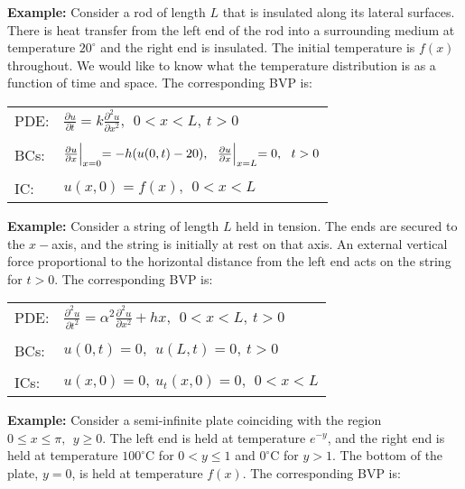 \vspace{0.15cm}

\noindent\textbf{Example: } Consider a rod of length $L$ that is insulated along its lateral surfaces.  There is heat transfer from the left end of the rod into a surrounding medium at temperature $20^{\circ}$ and the right end is insulated.  The initial temperature is $f(x)$ throughout.  We would like to know what the temperature distribution is as a function of time and space.  The corresponding BVP is:
\begin{table}
\begin{tabular}{l l}
PDE: & $\frac{\partial u}{\partial t}=k\frac{\partial^2 u}{\partial x^2}, \ \ 0<x<L, \ t>0 $ \\
& \\
BCs: & $\frac{\partial u}{\partial x}\Bigl|_{x=0} = -h(u(0,t)-20), \ \  \frac{\partial u}{\partial x}\Bigl|_{x=L} = 0, \ \ t>0$ \\
& \\
IC: & $u(x,0) = f(x), \ \ 0<x<L$ \\
\end{tabular}
\end{table}

\vspace{0.25cm}

\noindent\textbf{Example: } Consider a string of length $L$ held in tension.  The ends are secured to the $x-$axis, and the string is initially at rest on that axis.  An external vertical force proportional to the horizontal distance from the left end acts on the string for $t>0$.  The corresponding BVP is:
\begin{table}
\begin{tabular}{l l}
PDE: & $\frac{\partial^2 u}{\partial t^2} = \alpha^2 \frac{\partial^2 u}{\partial x^2} + hx, \ \ 0<x<L, \ t>0 $ \\
& \\
BCs: & $u(0,t)=0, \ \ u(L,t) = 0, \ t>0 $ \\
& \\
ICs: & $u(x,0) = 0, \ u_t(x,0) = 0, \ \ 0<x<L$ \\
\end{tabular}
\end{table}

\vspace{0.25cm}

\noindent\textbf{Example: } Consider a semi-infinite plate coinciding with the region $0 \le x \le \pi, \ \  y\ge 0.$  The left end is held at temperature $e^{-y}$, and the right end is held at temperature $100^{\circ}$C for $0 < y \le 1$ and $0^{\circ}$C for $y>1$.  The bottom of the plate, $y=0$, is held at temperature $f(x)$.  The corresponding BVP is:

